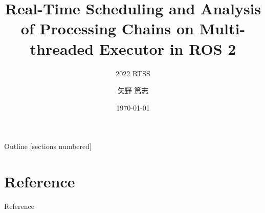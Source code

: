 \newcommand{\beamerDir}[0]{/mnt/c/Users/atsushi/Documents/workspace/env/Beamer/beamer/beamer/}





\newcommand{\forme}[1]{}


\title{Real-Time Scheduling and Analysis of Processing Chains on Multi-threaded Executor in ROS 2}
\subtitle{2022 RTSS}
\author{矢野 篤志}
\date{\today}




\maketitle



\begin{frame}{Outline}
    [sections numbered]
    \tiny\tableofcontents[hideallsubsections]
\end{frame}











\lastpage

\section*{Reference}
\begin{frame}[allowframebreaks]{Reference}
    \beamertemplatetextbibitems
    
    
\end{frame}


